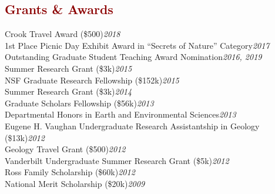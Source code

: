 \documentclass[11pt,margin,line]{resume}
\begin{document}
\begin{resume}
\section{\large\textcolor{DarkRed}{Grants \& Awards}}

Crook Travel Award (\$500)\hfill \emph{2018}\\
1st Place Picnic Day Exhibit Award in “Secrets of Nature” Category\hfill \emph{2017}\\
Outstanding Graduate Student Teaching Award Nomination\hfill \emph{2016, 2019}\\
Summer Research Grant (\$3k)\hfill \emph{2015}\\
NSF Graduate Research Fellowship (\$152k)\hfill \emph{2015}\\
Summer Research Grant (\$3k)\hfill \emph{2014}\\
Graduate Scholars Fellowship (\$56k)\hfill \emph{2013}\\
Departmental Honors in Earth and Environmental Sciences\hfill \emph{2013}\\
Eugene H. Vaughan Undergraduate Research Assistantship in Geology (\$13k)\hfill \emph{2012}\\
Geology Travel Grant (\$500)\hfill \emph{2012}\\
Vanderbilt Undergraduate Summer Research Grant (\$5k)\hfill \emph{2012}\\
Ross Family Scholarship (\$60k)\hfill \emph{2012}\\
National Merit Scholarship (\$20k)\hfill \emph{2009}\\\\\\\\

\begin{comment}


\end{comment}
\end{resume}
\end{document}

